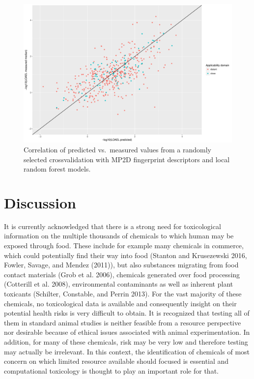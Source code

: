 \documentclass[]{achemso}
\begin{document}
\begin{figure}
\centering
\includegraphics{figures/crossvalidation.pdf}
\caption{Correlation of predicted vs.~measured values from a randomly
selected crossvalidation with MP2D fingerprint descriptors and local
random forest models.}\label{fig:cv}
\end{figure}

\section{Discussion}\label{discussion}

It is currently acknowledged that there is a strong need for
toxicological information on the multiple thousands of chemicals to
which human may be exposed through food. These include for example many
chemicals in commerce, which could potentially find their way into food
(Stanton and Krusezewski 2016, Fowler, Savage, and Mendez (2011)), but
also substances migrating from food contact materials (Grob et al.
2006), chemicals generated over food processing (Cotterill et al. 2008),
environmental contaminants as well as inherent plant toxicants
(Schilter, Constable, and Perrin 2013). For the vast majority of these
chemicals, no toxicological data is available and consequently insight
on their potential health risks is very difficult to obtain. It is
recognized that testing all of them in standard animal studies is
neither feasible from a resource perspective nor desirable because of
ethical issues associated with animal experimentation. In addition, for
many of these chemicals, risk may be very low and therefore testing may
actually be irrelevant. In this context, the identification of chemicals
of most concern on which limited resource available should focused is
essential and computational toxicology is thought to play an important
role for that.
\end{document}
